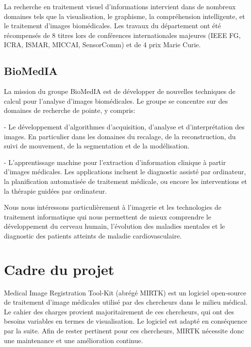 \documentclass[10pt]{report}
\begin{document}
	La recherche en traitement visuel d'informations intervient dans de nombreux domaines tels que la visualisation, le graphisme, la compréhension intelligente, et le traitement d'images biomédicales.  
	Les travaux du département ont été récompensés de 8 titres lors de conférences internationales majeures (IEEE FG, ICRA, ISMAR, MICCAI, SensorComm) et de 4 prix Marie Curie.
		

	
	\subsection{BioMedIA}
	
	La mission du groupe BioMedIA est de développer de nouvelles techniques de
	calcul pour l'analyse d'images biomédicales. Le groupe se concentre sur des
	domaines de recherche de pointe, y compris:

	- Le développement d'algorithmes d'acquisition, d'analyse et d'interprétation
	des images. En particulier dans les domaines du recalage, de la reconstruction,
	du suivi de mouvement, de la segmentation et de la modélisation.

	- L'apprentissage machine pour l'extraction d'information clinique à partir
	d'images médicales. Les applications incluent le diagnostic assisté par
	ordinateur, la planification automatisée de traitement médicale, ou encore les
	interventions et la thérapie guidées par ordinateur.

	Nous nous intéressons particulièrement à l'imagerie et les technologies de
	traitement informatique qui nous permettent de mieux comprendre le
	développement du cerveau humain, l’évolution des maladies mentales et le
	diagnostic des patients atteints de maladie cardiovasculaire.
	
	
	\section{Cadre du projet} %
	Medical Image Registration Tool-Kit (abrégé MIRTK) est un logiciel open-source de traitement d'image médicales utilisé par des chercheurs dans le milieu médical. Le cahier des charges provient majoritairement de ces chercheurs, qui ont des besoins variables en termes de visualisation. Le logiciel est adapté en conséquence par la suite.
	Afin de rester pertinent pour ces chercheurs, MIRTK nécessite donc une maintenance et une amélioration continue. 
	 
\end{document}
